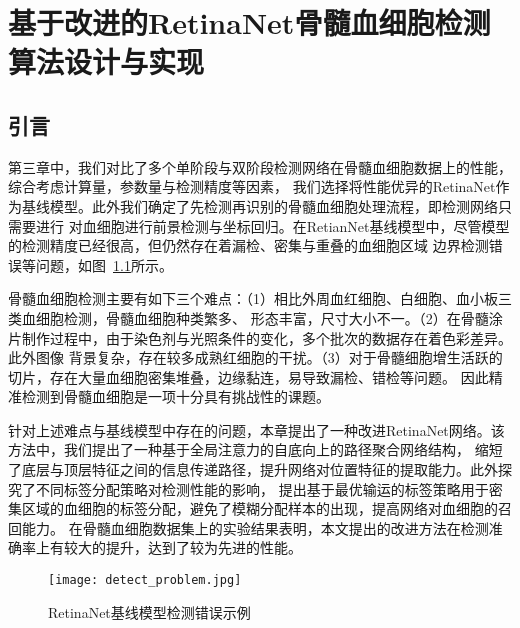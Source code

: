 \chapter{基于改进的RetinaNet骨髓血细胞检测算法设计与实现}
\section{引言}

第三章中，我们对比了多个单阶段与双阶段检测网络在骨髓血细胞数据上的性能，综合考虑计算量，参数量与检测精度等因素，
我们选择将性能优异的RetinaNet作为基线模型。此外我们确定了先检测再识别的骨髓血细胞处理流程，即检测网络只需要进行
对血细胞进行前景检测与坐标回归。在RetianNet基线模型中，尽管模型的检测精度已经很高，但仍然存在着漏检、密集与重叠的血细胞区域
边界检测错误等问题，如图~\ref{fig:detect_problem}所示。

骨髓血细胞检测主要有如下三个难点：（1）相比外周血红细胞、白细胞、血小板三类血细胞检测，骨髓血细胞种类繁多、
形态丰富，尺寸大小不一。（2）在骨髓涂片制作过程中，由于染色剂与光照条件的变化，多个批次的数据存在着色彩差异。此外图像
背景复杂，存在较多成熟红细胞的干扰。（3）对于骨髓细胞增生活跃的切片，存在大量血细胞密集堆叠，边缘黏连，易导致漏检、错检等问题。
因此精准检测到骨髓血细胞是一项十分具有挑战性的课题。

针对上述难点与基线模型中存在的问题，本章提出了一种改进RetinaNet网络。该方法中，我们提出了一种基于全局注意力的自底向上的路径聚合网络结构，
缩短了底层与顶层特征之间的信息传递路径，提升网络对位置特征的提取能力。此外探究了不同标签分配策略对检测性能的影响，
提出基于最优输运的标签策略用于密集区域的血细胞的标签分配，避免了模糊分配样本的出现，提高网络对血细胞的召回能力。
在骨髓血细胞数据集上的实验结果表明，本文提出的改进方法在检测准确率上有较大的提升，达到了较为先进的性能。

\begin{figure}[htbp]                     
  \centering                      
  \texttt{[image: detect\_problem.jpg]}                      
  \caption{RetinaNet基线模型检测错误示例}                      
  \label{fig:detect_problem}       
\end{figure}  


